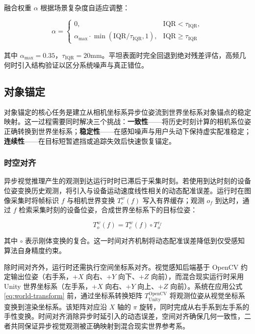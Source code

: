 \documentclass[review]{vgtc}
\begin{document}
融合权重 $\alpha$ 根据场景复杂度自适应调整：

\begin{equation}
\alpha = \begin{cases}
0, & \mathrm{IQR} < \tau_{\mathrm{IQR}}, \\
\alpha_{\mathrm{max}} \cdot \min\!\left(\mathrm{IQR}/\tau_{\mathrm{IQR}}, 1\right), & \mathrm{IQR} \geq \tau_{\mathrm{IQR}}
\end{cases}
\label{eq:depth-alpha}
\end{equation}


其中 $\alpha_{\mathrm{max}} = 0.35$，$\tau_{\mathrm{IQR}} = 20 \mathrm{mm}$。平坦表面时完全回退到绝对残差评估，高频几何时引入结构验证以区分系统噪声与真正错位。

\subsection{对象锚定}\label{sec:anchoring}


对象锚定的核心任务是建立从相机坐标系异步位姿流到世界坐标系对象锚点的稳定映射。这一过程需要同时解决三个挑战：\textbf{一致性}------将历史时刻计算的相机系位姿正确转换到世界坐标系；\textbf{稳定性}------在感知噪声与用户头动下保持虚实配准稳定；\textbf{连续性}------在目标短暂遮挡或追踪失效后快速恢复锚定。

\subsubsection{时空对齐}\label{sec:alignment}


异步视觉推理产生的观测到达运行时时已滞后于采集时刻。若使用到达时刻的设备位姿变换历史观测，将引入与设备运动速度线性相关的动态配准误差。运行时在图像采集时将帧标识 $f$ 与相机世界变换 $T_c^w(f)$ 写入有界缓存；观测 $o_f$ 到达时，通过 $f$ 检索采集时刻的设备位姿，合成世界坐标系下的目标位姿：

\begin{equation}
T_o^w (f) = T_c^w (f) \circ T_o^{c_f}
\label{eq:world-transform}
\end{equation}


其中 $\circ$ 表示刚体变换的复合。这一时间对齐机制将动态配准误差降低到仅受感知算法自身精度约束。

除时间对齐外，运行时还需执行空间坐标系对齐。视觉感知后端基于 OpenCV 约定输出位姿（右手系，$+X$ 向右、$+Y$ 向下、$+Z$ 向前），而混合现实运行时采用 Unity 世界坐标系（左手系，$+X$ 向右、$+Y$ 向上、$+Z$ 向前）。系统在应用公式 \ref{eq:world-transform} 前，通过坐标系转换矩阵 $T_{\mathrm{Unity}}^{\mathrm{OpenCV}}$ 将观测位姿从视觉坐标系变换到渲染坐标系。该矩阵对应沿 $X$ 轴的 $\pi$ 旋转，同时完成从右手系到左手系的手性变换。时间对齐消除异步时延引入的动态误差，空间对齐确保几何一致性，二者共同保证异步视觉观测被正确映射到混合现实世界参考系。
\end{document}
